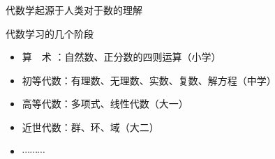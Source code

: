 \documentclass[11pt,punct]{ctexbeamer}
\begin{document}

\begin{frame}
	代数学起源于人类对于数的理解

	\vspace{6pt}

	代数学习的几个阶段
	\begin{itemize}
		\item 算~~术 ：自然数、正分数的四则运算（小学）
		\item 初等代数：有理数、无理数、实数、复数、解方程（中学）
		\item 高等代数：多项式、线性代数（大一）
		\item 近世代数：群、环、域（大二）
		\item $\cdots \cdots\cdots$
	\end{itemize}
\end{frame}
\end{document}
